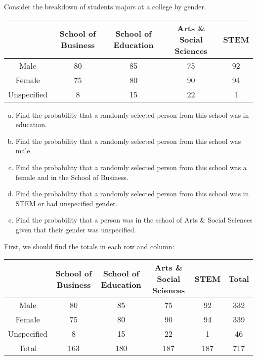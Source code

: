 \documentclass[11pt,letterpaper]{article}
\begin{document}
\newpage



 Consider the breakdown of students majors at a college by gender.
	\begin{table}[!ht]
	\centering
	\begin{tabular}{|c||c|c|c|c|} \hline
	& School of Business & School of Education & Arts \& Social Sciences & STEM \\ \hline \hline
	Male & 80 & 85 & 75 & 92 \\ \hline
	Female & 75 & 80 & 90 & 94 \\ \hline
	Unspecified & 8 & 15 & 22 & 1 \\ \hline
	\end{tabular}
	\end{table}

\begin{enumerate}[(a)]
\item Find the probability that a randomly selected person from this school was in education. 
\item Find the probability that a randomly selected person from this school was male.
\item Find the probability that a randomly selected person from this school was a female and in the School of Business.
\item Find the probability that a randomly selected person from this school was in STEM or had unspecified gender.
\item Find the probability that a person was in the school of Arts \& Social Sciences given that their gender was unspecified. 
\end{enumerate} \pspace

\sol First, we should find the totals in each row and column: 
	\begin{table}[!ht]
	\centering
	\begin{tabular}{|c||c|c|c|c||c|} \hline
	& School of Business & School of Education & Arts \& Social Sciences & STEM & Total \\ \hline \hline
	Male & 80 & 85 & 75 & 92 & 332 \\ \hline
	Female & 75 & 80 & 90 & 94 & 339 \\ \hline
	Unspecified & 8 & 15 & 22 & 1 & 46 \\ \hline \hline
	Total & 163 & 180 & 187 & 187 & 717 \\ \hline
	\end{tabular}
	\end{table}
\end{document}
